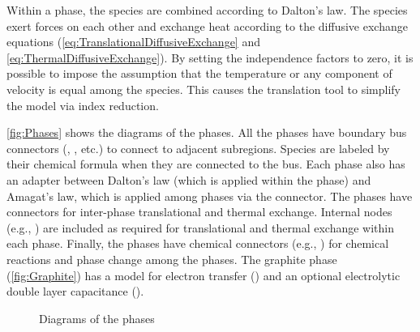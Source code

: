 Within a phase, the species are combined according to Dalton's law.  The species exert forces on each other and exchange heat according to the diffusive exchange equations (\ref{eq:TranslationalDiffusiveExchange} and \ref{eq:ThermalDiffusiveExchange}).  By setting the independence factors to zero, it is possible to impose the assumption that the temperature or any component of velocity is equal among the species.  This causes the translation tool to simplify the model via index reduction.  

\autoref{fig:Phases} shows the diagrams of the phases.  All the phases have boundary bus connectors (, , etc.) to connect to adjacent subregions.  Species are labeled by their chemical formula when they are connected to the bus.  Each phase also has an  adapter between Dalton's law (which is applied within the phase) and Amagat's law, which is applied among phases via the  connector.  The phases have  connectors for inter-phase translational and thermal exchange.  Internal nodes (e.g., ) are included as required for translational and thermal exchange within each phase.  Finally, the phases have chemical connectors (e.g., ) for chemical reactions and phase change among the phases.  The graphite phase (\autoref{fig:Graphite}) has a model for electron transfer () and an optional electrolytic double layer capacitance (). 

\begin{figure}[htbp]
  \quad
  \quad
\end{figure}

\begin{figure}[htb]
  \ContinuedFloat
  \caption{Diagrams of the phases}
  \label{fig:Phases}
\end{figure}


